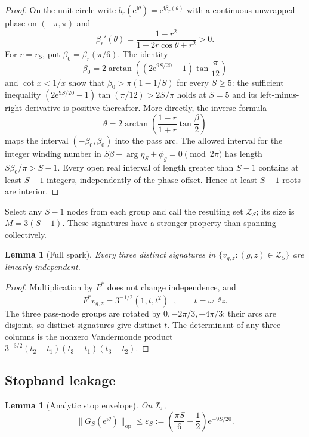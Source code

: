 \documentclass[11pt]{article}
\newtheorem{lemma}[theorem]{Lemma}
\theoremstyle{definition}
\theoremstyle{remark}
\newcommand{\cI}{\mathcal{I}}
\newcommand{\op}{\mathrm{op}}
\newcommand{\e}{\mathrm{e}}
\begin{document}
\begin{proof}
On the unit circle write $b_r(\e^{\mathrm{i}\theta})=
\e^{\mathrm{i}\beta_r(\theta)}$ with a continuous unwrapped phase on
$(-\pi,\pi)$ and
\[
 \beta_r'(\theta)=\frac{1-r^2}{1-2r\cos\theta+r^2}>0.
\]
For $r=r_S$, put $\beta_0=\beta_r(\pi/6)$.  The identity
\[
 \beta_0=2\arctan\!\left((2\e^{9S/20}-1)\tan\frac{\pi}{12}\right)
\]
and $\cot x<1/x$ show that $\beta_0>\pi(1-1/S)$ for every
$S\geq5$: the sufficient inequality
$(2\e^{9S/20}-1)\tan(\pi/12)>2S/\pi$ holds at $S=5$ and its
left-minus-right derivative is positive thereafter.  More directly, the inverse formula
\[
 \theta=2\arctan\!\left(\frac{1-r}{1+r}\tan\frac{\beta}{2}\right)
\]
maps the interval $(-\beta_0,\beta_0)$ into the pass arc.  The allowed interval
for the integer winding number in
$S\beta+\arg\eta_S+\phi_g=0\pmod{2\pi}$ has length
$S\beta_0/\pi>S-1$.  Every open real interval of length greater than $S-1$
contains at least $S-1$ integers, independently of the phase offset.  Hence at
least $S-1$ roots are interior.
\end{proof}

Select any $S-1$ nodes from each group and call the resulting set $\mathcal Z_S$;
its size is $M=3(S-1)$.  These signatures have a stronger property than
spanning collectively.

\begin{lemma}[Full spark]\label{lem:fullspark}
Every three distinct signatures in $\{v_{g,z}:(g,z)\in\mathcal Z_S\}$ are
linearly independent.
\end{lemma}

\begin{proof}
Multiplication by $F^*$ does not change independence, and
\[
 F^*v_{g,z}=3^{-1/2}(1,t,t^2)^\top,
 \qquad t=\omega^{-g}z.
\]
The three pass-node groups are rotated by $0,-2\pi/3,-4\pi/3$; their arcs are
disjoint, so distinct signatures give distinct $t$.  The determinant of any
three columns is the nonzero Vandermonde product
$3^{-3/2}(t_2-t_1)(t_3-t_1)(t_3-t_2)$.
\end{proof}

\subsection{Stopband leakage}

\begin{lemma}[Analytic stop envelope]\label{lem:stop}
On $\cI_{\rm s}$,
\begin{equation}\label{eq:eps}
 \|G_S(\e^{\mathrm{i}\theta})\|_{\op}
 \leq\varepsilon_S:=
 \left(\frac{\pi S}{6}+\frac12\right)\e^{-9S/20}.
\end{equation}
\end{lemma}
\end{document}
